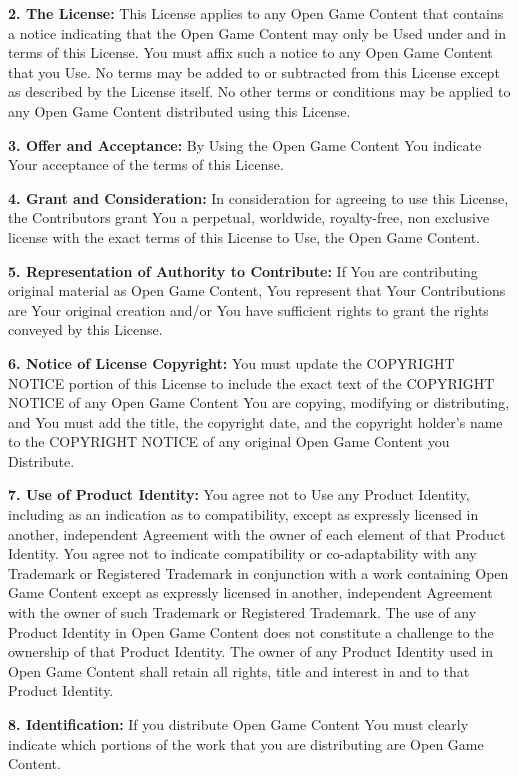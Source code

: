 \documentclass[10pt, a4paper, twoside]{book}
\begin{document}
{	\textbf{2. The License:} This License applies to any Open Game Content that contains a notice indicating that the Open Game Content may only be Used under and in terms of this License. You must affix such a notice to any Open Game Content that you Use. No terms may be added to or subtracted from this License except as described by the License itself. No other terms or conditions may be applied to any Open Game Content distributed using this License. \par
	\textbf{3. Offer and Acceptance:} By Using the Open Game Content You indicate Your acceptance of the terms of this License. \par
	\textbf{4. Grant and Consideration:} In consideration for agreeing to use this License, the Contributors grant You a perpetual, worldwide, royalty-free, non exclusive license with the exact terms of this License to Use, the Open Game Content. \par
	\textbf{5. Representation of Authority to Contribute:} If You are contributing original material as Open Game Content, You represent that Your Contributions are Your original creation and/or You have sufficient rights to grant the rights conveyed by this License. \par
	\textbf{6. Notice of License Copyright:} You must update the COPYRIGHT NOTICE portion of this License to include the exact text of the COPYRIGHT NOTICE of any Open Game Content You are copying, modifying or distributing, and You must add the title, the copyright date, and the copyright holder's name to the COPYRIGHT NOTICE of any original Open Game Content you Distribute. \par 
	\textbf{7. Use of Product Identity:} You agree not to Use any Product Identity, including as an indication as to compatibility, except as expressly licensed in another, independent Agreement with the owner of each element of that Product Identity. You agree not to indicate compatibility or co-adaptability with any Trademark or Registered Trademark in conjunction with a work containing Open Game Content except as expressly licensed in another, independent Agreement with the owner of such Trademark or Registered Trademark. The use of any Product Identity in Open Game Content does not constitute a challenge to the ownership of that Product Identity. The owner of any Product Identity used in Open Game Content shall retain all rights, title and interest in and to that Product Identity. \par 
	\textbf{8. Identification:} If you distribute Open Game Content You must clearly indicate which portions of the work that you are distributing are Open Game Content. \par 
}
\end{document}
